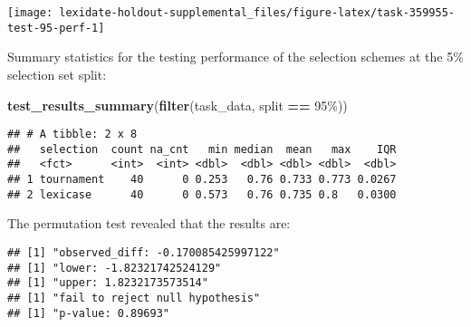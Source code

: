 \documentclass[
]{book}
\newenvironment{Shaded}{\begin{snugshade}}{\end{snugshade}}
\newcommand{\AttributeTok}[1]{\textcolor[rgb]{0.13,0.29,0.53}{#1}}
\newcommand{\DecValTok}[1]{\textcolor[rgb]{0.00,0.00,0.81}{#1}}
\newcommand{\FunctionTok}[1]{\textcolor[rgb]{0.13,0.29,0.53}{\textbf{#1}}}
\newcommand{\NormalTok}[1]{#1}
\newcommand{\OtherTok}[1]{\textcolor[rgb]{0.56,0.35,0.01}{#1}}
\newcommand{\SpecialCharTok}[1]{\textcolor[rgb]{0.81,0.36,0.00}{\textbf{#1}}}
\newcommand{\StringTok}[1]{\textcolor[rgb]{0.31,0.60,0.02}{#1}}
\begin{document}
\texttt{[image: lexidate-holdout-supplemental\_files/figure-latex/task-359955-test-95-perf-1]}

Summary statistics for the testing performance of the selection schemes at the 5\% selection set split:

\begin{Shaded}
\begin{Highlighting}[]
\FunctionTok{test\_results\_summary}\NormalTok{(}\FunctionTok{filter}\NormalTok{(task\_data, split }\SpecialCharTok{==} \StringTok{\textquotesingle{}95\%\textquotesingle{}}\NormalTok{))}
\end{Highlighting}
\end{Shaded}

\begin{verbatim}
## # A tibble: 2 x 8
##   selection  count na_cnt   min median  mean   max    IQR
##   <fct>      <int>  <int> <dbl>  <dbl> <dbl> <dbl>  <dbl>
## 1 tournament    40      0 0.253   0.76 0.733 0.773 0.0267
## 2 lexicase      40      0 0.573   0.76 0.735 0.8   0.0300
\end{verbatim}

The permutation test revealed that the results are:

\begin{Shaded}
\end{Shaded}

\begin{verbatim}
## [1] "observed_diff: -0.170085425997122"
## [1] "lower: -1.82321742524129"
## [1] "upper: 1.8232173573514"
## [1] "fail to reject null hypothesis"
## [1] "p-value: 0.89693"
\end{verbatim}
\end{document}
